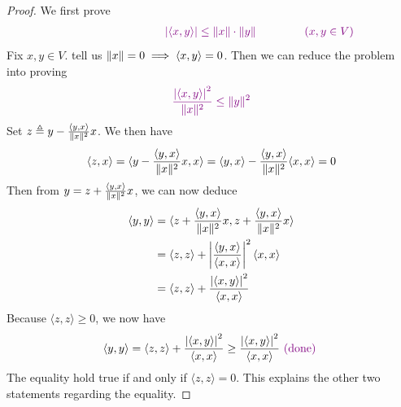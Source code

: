 \documentclass{report}
\begin{document}
\begin{proof}
We first prove 
\begin{align*}
  \vi{\hspace{3cm}\abso{\langle x,y\rangle }\leq \norm{x}\cdot\norm{y}\hspace{1.5cm}(x,y \in V)}
\end{align*}
Fix $x,y \in V$.  tell us $\| x \|=0 \implies  \langle x,y\rangle =0$. Then we can reduce the problem into proving 
\begin{align*}
\textcolor{violet}{\frac{\left|\langle x,y\rangle \right|^2}{\| x \|^2}\leq\| y \|^2  }
\end{align*}
Set $z\triangleq y-\frac{\langle y,x\rangle }{\| x \|^2}x$. We then have 
\begin{align*}
\langle z,x\rangle =\langle y-\frac{\langle y,x\rangle }{\| x \|^2}x,x \rangle =\langle y,x\rangle - \frac{\langle y,x\rangle }{\| x \|^2}\langle x,x\rangle =0
\end{align*}
Then from $y=z+\frac{\langle y,x\rangle }{\| x \|^2}x$, we can now deduce
\begin{align*}
\langle y,y\rangle &= \langle z+\frac{\langle y,x\rangle }{\| x \|^2}x,z+ \frac{\langle y,x\rangle }{\| x \|^2}x\rangle  \\
&=\langle z,z\rangle + \left|\frac{\langle y,x\rangle }{\langle x,x\rangle }\right|^2 \langle x,x\rangle \\
&=\langle z,z\rangle + \frac{\left|\langle x,y\rangle \right|^2}{\langle x,x\rangle }
\end{align*}
Because $\langle z,z\rangle\geq 0 $, we now have
\begin{align*}
\langle y,y\rangle = \langle z,z\rangle + \frac{\left|\langle x,y\rangle \right|^2}{\langle x,x\rangle }\geq  \frac{\left|\langle x,y\rangle \right|^2}{\langle x,x\rangle }\textcolor{violet}{\text{ (done) }}
\end{align*}
The equality hold true if and only if $\langle z,z\rangle =0$. This explains the other two statements regarding the equality. 
\end{proof}
\end{document}
